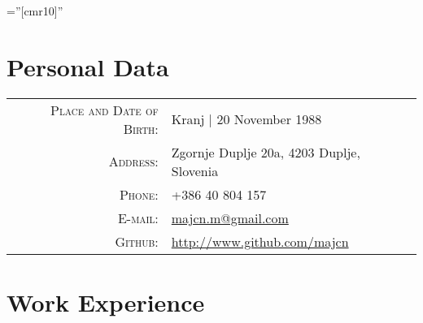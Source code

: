 \documentclass[a4paper,10pt]{article} %
\begin{document}
\pagestyle{empty} %

\font\fb=''[cmr10]'' %


\par{\bigskip\par} %

\section{Personal Data}

\begin{tabular}{rl}
\textsc{Place and Date of Birth:} & Kranj | 20 November 1988 \\
\textsc{Address:} & Zgornje Duplje 20a, 4203 Duplje, Slovenia \\
\textsc{Phone:} & +386 40 804 157\\
\textsc{E-mail:} & \href{mailto:majcn.m@gmail.com}{majcn.m@gmail.com} \\
\textsc{Github:} & \href{http://www.github.com/majcn}{http://www.github.com/majcn} \\
\end{tabular}


\section{Work Experience}
\end{document}
